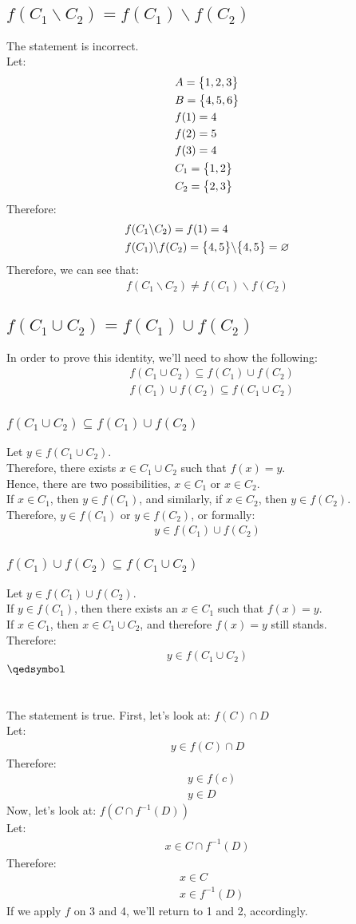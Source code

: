 \documentclass[a4paper, 12pt]{article}
\newcommand{\sub}[1]{\subsection{\underline{#1}}}
\newcommand{\subsub}[1]{\subsubsection{\underline{#1}}}
\newcommand{\eq}[1]{\begin{align*}#1\end{align*}}
\newcommand{\eqn}[1]{\begin{align}#1\end{align}}
\newcommand{\set}[1]{\big{\{} #1 \big{\}}}
\renewcommand{\qed}{\hfill\(\qedsymbol\)}
\begin{document}
\begin{titlepage}
    
\end{titlepage}

\section{}
\sub{$f(C_1\backslash{C_2})=f(C_1)\backslash{f(C_2)}$}
The statement is incorrect.\\
Let:
\eq{
    &A=\set{1,2,3}\\
    &B=\set{4,5,6}\\
    &f(1)=4\\
    &f(2)=5\\
    &f(3)=4\\
    &C_1=\set{1,2}\\
    &C_2=\set{2,3}
}
Therefore:
\eq{
    &f(C_1\backslash{C_2})=f(1)=4\\
    &f(C_1)\backslash{f(C_2)}=\set{4,5}\backslash\set{4,5}=\varnothing
}
Therefore, we can see that: \eq{f(C_1\backslash{C_2})\neq{f(C_1)\backslash{f(C_2)}}}
\sub{$f(C_1\cup{C_2})=f(C_1)\cup{f(C_2)}$}
In order to prove this identity, we'll need to show the following:
\eq{
    &f(C_1\cup{C_2})\subseteq{f(C_1)\cup{f(C_2)}}\\
    &{f(C_1)\cup{f(C_2)}\subseteq{f(C_1\cup{C_2})}}
}
\subsub{$f(C_1\cup{C_2})\subseteq{f(C_1)\cup{f(C_2)}}$}
Let $y\in f(C_1\cup{C_2})$.\\
Therefore, there exists $x\in{C_1\cup{C_2}}$ such that $f(x)=y$.\\
Hence, there are two possibilities, $x\in{C_1}$ or $x\in{C_2}$.\\
If $x\in{C_1}$, then $y\in f({C_1})$, and similarly, if $x\in{C_2}$, then $y\in f({C_2})$.\\
Therefore, $y\in f({C_1})$ or $y\in f({C_2})$, or formally:
\eq{y\in f({C_1})\cup f({C_2})}

\subsub{${f(C_1)\cup{f(C_2)}\subseteq{f(C_1\cup{C_2})}}$}
Let $y\in f(C_1)\cup f({C_2})$.\\
If $y\in f(C_1)$, then there exists an $x\in{C_1}$ such that $f(x)=y$.\\
If $x\in{C_1}$, then $x\in{C_1}\cup{C_2}$, and therefore $f(x)=y$ still stands.\\
Therefore:
\eq{y\in f({C_1}\cup{C_2})}
\qed\pagebreak

\section{}
\sub{}
The statement is true.
First, let's look at: $f(C)\cap D$\\
Let: \eq{y\in f(C)\cap D}
Therefore:
\eqn{
    &y\in f(c)\\
    &y\in D
}
Now, let's look at: $f(C\cap f^{-1}(D))$\\
Let: \eq{x\in C\cap f^{-1}(D)}
Therefore: \eqn{&x\in{C}\\&x\in{f^{-1}(D)}}
If we apply $f$ on 3 and 4, we'll return to 1 and 2, accordingly.
\end{document}
